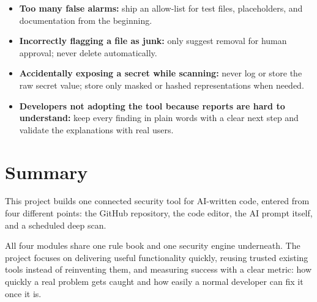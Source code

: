 \documentclass[11pt,a4paper]{article}
\begin{document}
\begin{itemize}[leftmargin=0.7cm]

    \item \textbf{Too many false alarms:} ship an allow-list for test files, placeholders, and documentation from the beginning.

    \item \textbf{Incorrectly flagging a file as junk:} only suggest removal for human approval; never delete automatically.

    \item \textbf{Accidentally exposing a secret while scanning:} never log or store the raw secret value; store only masked or hashed representations when needed.

    \item \textbf{Developers not adopting the tool because reports are hard to understand:} keep every finding in plain words with a clear next step and validate the explanations with real users.

\end{itemize}

\section{Summary}

This project builds one connected security tool for AI-written code, entered from four different points: the GitHub repository, the code editor, the AI prompt itself, and a scheduled deep scan.

All four modules share one rule book and one security engine underneath. The project focuses on delivering useful functionality quickly, reusing trusted existing tools instead of reinventing them, and measuring success with a clear metric: how quickly a real problem gets caught and how easily a normal developer can fix it once it is.
\end{document}
